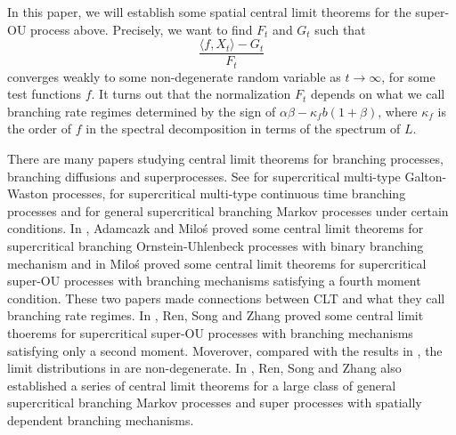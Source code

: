 \documentclass[12pt,a4paper]{amsart}
\theoremstyle{plain}
\theoremstyle{definition}
\numberwithin{equation}{section}
\begin{document}
 In this paper, we will establish some spatial central limit theorems for the super-OU process above. Precisely, we want to find $F_t$ and $G_t$ such that
 $$\frac{\langle f, X_t \rangle -G_t}{F_t}$$ converges weakly to some non-degenerate random variable as $t\rightarrow\infty$, for some test functions $f$. It turns out that the normalization $F_t$ depends on what we call branching rate regimes determined by the sign of $\alpha\beta-\kappa_f b (1+\beta)$, where $\kappa_f$ is the order of $f$ in the spectral 
 decomposition in terms of the spectrum of $L$.

 There are many papers studying central limit theorems for branching processes, branching diffusions and superprocesses. See \cite{HKBPS1,HKBPS2} for supercritical multi-type Galton-Waston processes, \cite{KBA1,KBA2,KBA3} for supercritical multi-type continuous time branching processes and \cite{ASHH} for general supercritical branching Markov processes 
 under certain conditions. 
 In \cite{ARMP}, Adamcazk and Milo\'s proved some central limit theorems for supercritical branching Ornstein-Uhlenbeck processes with binary branching mechanism and in \cite{MP2012} Milo\'s proved some central limit theorems for supercritical super-OU processes with branching mechanisms satisfying a fourth moment condition. 
These two papers made connections
 between CLT and what they call branching rate regimes. In \cite{RSZ}, Ren, Song and Zhang proved some central limit thoerems for supercritical super-OU processes with branching mechanisms satisfying only a second moment. 
 Moverover, compared with the results in \cite{ARMP,MP2012}, 
 the limit distributions in \cite{RSZ} are non-degenerate. 
 In \cite{RSZ1,RSZ2,RSZ3,RSZ4}, Ren, Song and Zhang also established
 a series of central limit theorems for a large class of general supercritical branching Markov processes and super processes with spatially dependent branching mechanisms.
\end{document}
